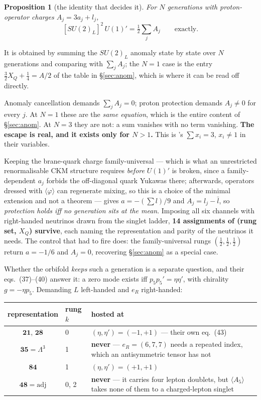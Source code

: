 \documentclass[11pt,a4paper]{article}
\newtheorem{proposition}{Proposition}
\newcommand{\su}[1]{SU(#1)}
\newcommand{\rep}[1]{\mathbf{#1}}
\begin{document}
\begin{proposition}[the identity that decides it]\label{prop:identity}
For $N$ generations with proton-operator charges $A_j=3a_j+l_j$,
\[
[\su2_L]^2\,U(1)'=\tfrac12\sum_j A_j\qquad\text{exactly}.
\]
\end{proposition}

\noindent
It is obtained by summing the $\su2_L$ anomaly state by state over $N$ generations and comparing
with $\sum_jA_j$; the $N=1$ case is the entry $\tfrac32X_Q+\tfrac14=A/2$ of the table in
\S\ref{sec:anom}, which is where it can be read off directly.

Anomaly cancellation demands $\sum_j A_j=0$; proton protection demands $A_j\neq0$ for every $j$. At
$N=1$ these are the \emph{same equation}, which is the entire content of \S\ref{sec:anom}. At $N=3$
they are not: a sum vanishes with no term vanishing. \textbf{The escape is real, and it exists only
for $N>1$.} This is \cite{FamilyU1}'s $\sum x_i=3$, $x_i\neq1$ in their variables.

Keeping the brane-quark charge family-universal --- which is what an unrestricted renormalisable CKM
structure requires \emph{before} $U(1)'$ is broken, since a family-dependent $a_j$ forbids the
off-diagonal quark Yukawas there; afterwards, operators dressed with $\langle\varphi\rangle$ can
regenerate mixing, so this is a choice of the minimal extension and not a theorem --- gives
$a=-(\sum l)/9$ and
$A_j=l_j-\bar l$, so \emph{protection holds iff no generation sits at the mean}. Imposing all six
channels with right-handed neutrinos drawn from the singlet ladder, \textbf{14 assignments of (rung
set, $X_Q$) survive}, each naming the representation and parity of the neutrinos it needs. The
control that had to fire does: the family-universal rungs $(\tfrac12,\tfrac12,\tfrac12)$ return
$a=-1/6$ and $A_j=0$, recovering \S\ref{sec:anom} as a special case.

Whether the orbifold \emph{keeps} such a generation is a separate question, and their eqs.~(37)--(40)
answer it: a zero mode exists iff $p_5p_5'=\eta\eta'$, with chirality $g=-\eta p_5$. Demanding $L$
left-handed and $e_R$ right-handed:

\begin{center}\small
\begin{tabular}{clp{}}
\toprule
\rowcolor{hdrblue!12}
representation & rung $k$ & hosted at\\
\midrule
$\rep{21}$, $\rep{28}$ & 0 & $(\eta,\eta')=(-1,+1)$ --- their own eq.~(43)\\
\rowcolor{warmred!13}
$\rep{35}=\Lambda^3$ & 1 & \textbf{never} --- $e_R=(6,7,7)$ needs a repeated index, which an
antisymmetric tensor has not\\
\rowcolor{amber!16}
$\rep{84}$ & 1 & $(\eta,\eta')=(+1,+1)$\\
\rowcolor{warmred!13}
$\rep{48}=\text{adj}$ & 0, 2 & \textbf{never} --- it carries four lepton doublets, but
$\langle A_5\rangle$ takes none of them to a charged-lepton singlet\\
\bottomrule
\end{tabular}
\end{center}
\end{document}
